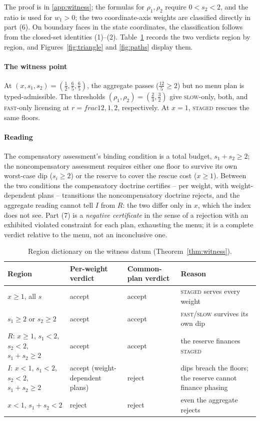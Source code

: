 \documentclass[preprint,11pt,authoryear]{elsarticle}
\theoremstyle{definition}
\theoremstyle{remark}
\newcommand{\act}[1]{\textsc{#1}}
\begin{document}
The proof is in \ref{app:witness}; the formulas for $\rho_1,\rho_2$ require $0<s_2<2$, and the ratio is used for $w_1>0$; the two coordinate-axis weights are classified directly in part (6). On boundary faces in the state coordinates, the classification follows from the closed-set identities (1)--(2). Table~\ref{tab:regions} records the two verdicts region by region, and Figures~\ref{fig:triangle} and \ref{fig:paths} display them.

\paragraph{The witness point} At $(x,s_1,s_2)=(\tfrac12,\tfrac65,\tfrac65)$, the aggregate passes ($\tfrac{12}5\ge2$) but no menu plan is typed-admissible. The thresholds $(\rho_1,\rho_2)=(\tfrac23,\tfrac32)$ give \act{slow}-only, both, and \act{fast}-only licensing at $r=	frac12,1,2$, respectively. At $x=1$, \act{staged} rescues the same floors.

\paragraph{Reading} The compensatory assessment's binding condition is a total budget, $s_1+s_2\ge2$; the noncompensatory assessment requires either one floor to survive its own worst-case dip ($s_i\ge2$) or the reserve to cover the rescue cost ($x\ge1$). Between the two conditions the compensatory doctrine certifies -- per weight, with weight-dependent plans -- transitions the noncompensatory doctrine rejects, and the aggregate reading cannot tell $I$ from $R$: the two differ only in $x$, which the index does not see. Part (7) is a \emph{negative certificate} in the sense of a rejection with an exhibited violated constraint for each plan, exhausting the menu; it is a complete verdict relative to the menu, not an inconclusive one.

\begin{table}[!htbp]
\centering\small
\caption{Region dictionary on the witness datum (Theorem~\ref{thm:witness}).}
\label{tab:regions}
\begin{tabularx}{\textwidth}{@{}>{\raggedright\arraybackslash}p{}>{\raggedright\arraybackslash}p{}>{\raggedright\arraybackslash}p{}X@{}}
\toprule
Region & Per-weight verdict & Common-plan verdict & Reason \\
\midrule
$x\ge1$, all $s$ & accept & accept & \act{staged} serves every weight \\
$s_1\ge2$ or $s_2\ge2$ & accept & accept & \act{fast}/\act{slow} survives its own dip \\
$R$: $x\ge1$, $s_1<2$, $s_2<2$, $s_1+s_2\ge2$ & accept & accept & the reserve finances \act{staged} \\
$I$: $x<1$, $s_1<2$, $s_2<2$, $s_1+s_2\ge2$ & accept (weight-dependent plans) & reject & dips breach the floors; the reserve cannot finance phasing \\
$x<1$, $s_1+s_2<2$ & reject & reject & even the aggregate rejects \\
\bottomrule
\end{tabularx}
\end{table}
\end{document}
